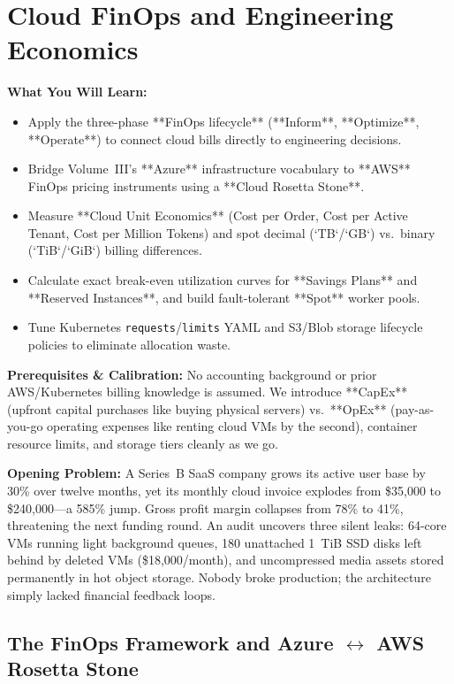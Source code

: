 \chapter{Cloud FinOps and Engineering Economics}
\label{chap:finops}

\begin{chaptergoalsbox}
\textbf{What You Will Learn:}
\begin{itemize}[leftmargin=12pt]
  \item Apply the three-phase **FinOps lifecycle** (**Inform**, **Optimize**, **Operate**) to connect cloud bills directly to engineering decisions.
  \item Bridge Volume~III's **Azure** infrastructure vocabulary to **AWS** FinOps pricing instruments using a **Cloud Rosetta Stone**.
  \item Measure **Cloud Unit Economics** (Cost per Order, Cost per Active Tenant, Cost per Million Tokens) and spot decimal (`TB`/`GB`) vs.\ binary (`TiB`/`GiB`) billing differences.
  \item Calculate exact break-even utilization curves for **Savings Plans** and **Reserved Instances**, and build fault-tolerant **Spot** worker pools.
  \item Tune Kubernetes \texttt{requests}/\texttt{limits} YAML and S3/Blob storage lifecycle policies to eliminate allocation waste.
\end{itemize}

\textbf{Prerequisites \& Calibration:}
No accounting background or prior AWS/Kubernetes billing knowledge is assumed. We introduce **CapEx** (upfront capital purchases like buying physical servers) vs.\ **OpEx** (pay-as-you-go operating expenses like renting cloud VMs by the second), container resource limits, and storage tiers cleanly as we go.

\textbf{Opening Problem:}
A Series~B SaaS company grows its active user base by 30\% over twelve months, yet its monthly cloud invoice explodes from \$35,000 to \$240,000---a 585\% jump. Gross profit margin collapses from 78\% to 41\%, threatening the next funding round. An audit uncovers three silent leaks: 64-core VMs running light background queues, 180 unattached 1~TiB SSD disks left behind by deleted VMs (\$18,000/month), and uncompressed media assets stored permanently in hot object storage. Nobody broke production; the architecture simply lacked financial feedback loops.
\end{chaptergoalsbox}

\section{The FinOps Framework and Azure $\leftrightarrow$ AWS Rosetta Stone}

